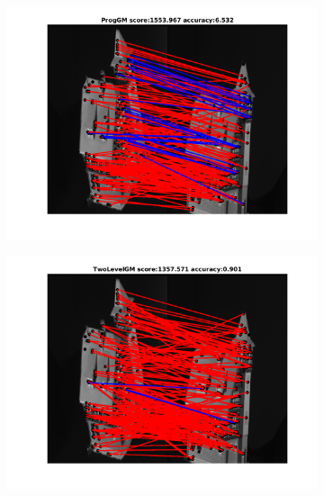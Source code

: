 \begin{figure}[h!] 
	\begin{subfigure}[b]{0.3\textwidth}
		\centering
		\includegraphics[scale=0.25]{"chapter3/fig/HouseSeq/anchor_descr/using_cpd_afftrafo/solution/fi_11_ProgGM"}  
	\end{subfigure}%
	\begin{subfigure}[b]{0.3\textwidth}
		\centering
		\includegraphics[scale=0.25]{"chapter3/fig/HouseSeq/anchor_descr/using_cpd_afftrafo/solution/fi_11_TwoLevelGM"}  
	\end{subfigure} 
	\begin{subfigure}[b]{0.3\textwidth}
		\centering

\end{subfigure}
\end{figure}
